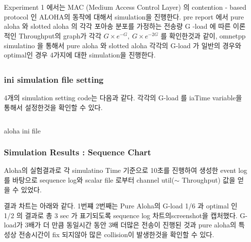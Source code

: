 \vspace{-6mm}
\section{}
Experiment 1 에서는 MAC (Medium Access Control Layer) 의 contention - based protocol 인 ALOHA의 동작에 대해서 simulation을 진행한다. 
pre report 에서 pure aloha 와 slotted aloha 의 각각 포아송 분포를 가정하는 전송량 G -load 에 따른  이론적인 Throughput의 graph가 각각 $G\times e^{-G},\ G\times e^{-2G}$   를 확인한것과 같이, omnetpp simulatino 을 통해서 pure aloha 와 slotted aloha 각각의   G-load 가 일반의 경우와  optimal인 경우 4가지에 대한  simulation을 진행한다.
\vspace{-2mm}
\subsection{}
    \vspace{-2mm}
    \subsubsection{ini simulation file setting}
    \vspace{-2mm}
    4개의 simulation setting code는 다음과 같다. 각각의 G-load 를 iaTime variable을 통해서 설정한것을 확인할 수 있다.
            \vspace{-2mm}
            \begin{listing}[h!]
            \inputminted[framerule = 1pt,framesep = 2mm , frame = lines, fontsize=\scriptsize ]{c}{./code/week12/Experiment_01/ini.cpp}
            \vspace{-3mm}
            \caption{\footnotesize aloha ini file}
            \end{listing}
            \vspace{-6mm}
    \subsubsection{Simulation Results : Sequence Chart}
    \vspace{-3mm}
    Aloha의 실험결과로 각 simulatino Time 기준으로 10초를 진행하여 생성한 event log를 바탕으로 sequence log와 scalar file 로부터 channel util($\sim$ Throughput) 값을 얻을 수 있었다.
    
    결과 차트는 아래와 같다. 1번쨰 2번째는 Pure Aloha의 G-load 1/6 과 optimal 인 1/2 의 결과로 총 3 sec 가 표기되도록 sequence log 차트의screenshot을 캡처했다. G-load가 3배가 더 만큼 동일시간 동안 3배 더많은 전송이 진행된 것과 pure aloha의 특성상 전송시간이 fix 되지않아 많은 collision이 발생한것을 확인할 수 있다.
    
